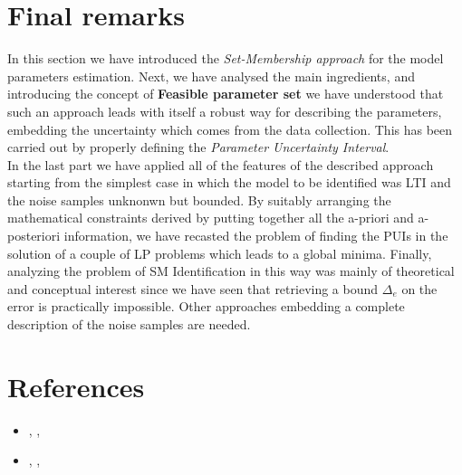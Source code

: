 \section{Final remarks}
In this section we have introduced the \textit{Set-Membership approach} for the model parameters estimation. Next, we have analysed the main ingredients, and introducing the concept of \textbf{Feasible parameter set} we have understood that such an approach leads with itself a robust way for describing the parameters, embedding the uncertainty which comes from the data collection. This has been carried out by properly defining the \textit{Parameter Uncertainty Interval}. \\

In the last part we have applied all of the features of the described approach starting from the simplest case in which the model to be identified was LTI and the noise samples unknonwn but bounded. By suitably arranging the mathematical constraints derived by putting together all the a-priori and a-posteriori information, we have recasted the problem of finding the PUIs in the solution of a couple of LP problems which leads to a global minima. Finally, analyzing the problem of SM Identification in this way was mainly of theoretical and conceptual interest since we have seen that retrieving a bound $\Delta_e$ on the error is practically impossible. Other approaches embedding a complete description of the noise samples are needed.

\section*{References}

\begin{itemize}
    \itemsep-0.3em
    \item[\Large{\ding{45}}]  , \textit{}, 
    \item[\Large{\ding{45}}]  , \textit{}, 
\end{itemize}